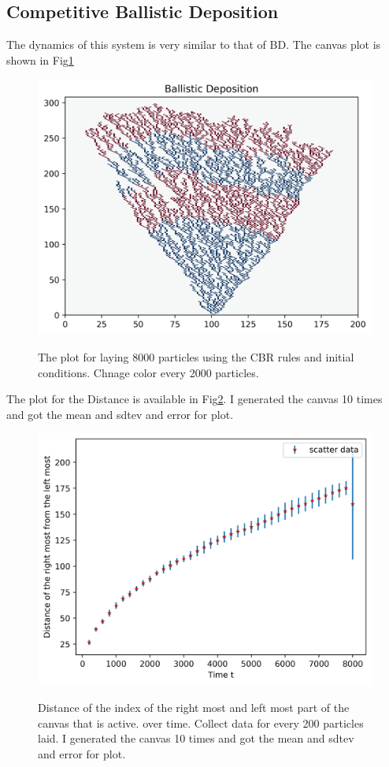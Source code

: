 \documentclass[12pt]{article}
\begin{document}
	\subsection{Competitive Ballistic Deposition}
	The dynamics of this system is very similar to that of BD. The canvas plot is shown in Fig\ref{fig:CBD}
	\begin{figure}[h!]
		\includegraphics[width=0.9\linewidth]{../P7/canvas.jpg}
		\label{fig:CBD}
		\caption{The plot for laying  8000 particles using the CBR rules and  initial conditions. Chnage color every 2000 particles.}
		\end{figure}

		The plot for the Distance is available in Fig\ref{fig:CBDdist}. I generated the canvas 10 times and got the mean and sdtev and error for plot.
		\begin{figure}[h!]
			\includegraphics[width=.9\linewidth]{../P7/dist_plot.jpg}
			\label{fig:CBDdist}
			\caption{Distance of the index of the right most and left most part of the canvas that is active. over time. Collect data for every 200 particles laid. I generated the canvas 10 times and got the mean and sdtev and error for plot.}
	\end{figure}
\end{document}
